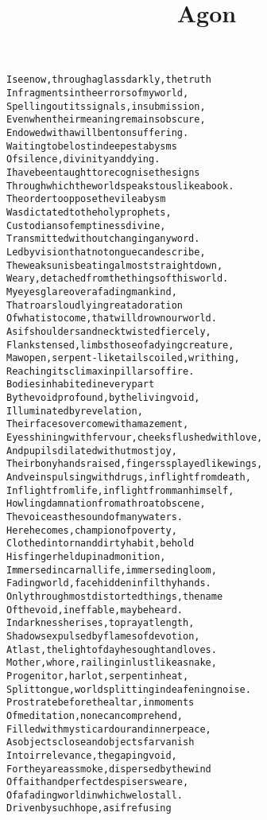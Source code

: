 \documentclass{article}
\title{Agon}
\begin{document}
\maketitle

\clearpage

\begin{alltt}\normalfont
I see now, through a glass darkly, the truth
In fragments in the errors of my world,
Spelling out its signals, in submission,
Even when their meaning remains obscure,
Endowed with a will bent on suffering.
Waiting to be lost in deepest abysms
Of silence, divinity and dying.
I have been taught to recognise the signs
Through which the world speaks to us like a book.
The order to oppose the vile abysm
Was dictated to the holy prophets,
Custodians of emptiness divine,
Transmitted without changing any word.
Led by vision that no tongue can describe,
The weak sun is beating almost straight down,
Weary, detached from the things of this world.
My eyes glare over a fading mankind,
That roars loudly in great adoration
Of what is to come, that will drown our world.
As if shoulders and neck twisted fiercely,
Flanks tensed, limbs those of a dying creature,
Maw open, serpent-like tails coiled, writhing,
Reaching its climax in pillars of fire.
Bodies inhabited in every part
By the void profound, by the living void,
Illuminated by revelation,
Their faces overcome with amazement,
Eyes shining with fervour, cheeks flushed with love,
And pupils dilated with utmost joy,
Their bony hands raised, fingers splayed like wings,
And veins pulsing with drugs, in flight from death,
In flight from life, in flight from man himself,
Howling damnation from a throat obscene,
The voice as the sound of many waters.
Here he comes, champion of poverty,
Clothed in torn and dirty habit, behold
His finger held up in admonition,
Immersed in carnal life, immersed in gloom,
Fading world, face hidden in filthy hands.
Only through most distorted things, the name
Of the void, ineffable, may be heard.
In darkness he rises, to pray at length,
Shadows expulsed by flames of devotion,
At last, the light of day he sought and loves.
Mother, whore, railing in lust like a snake,
Progenitor, harlot, serpent in heat,
Split tongue, world splitting in deafening noise.
Prostrate before the altar, in moments
Of meditation, none can comprehend,
Filled with mystic ardour and inner peace,
As objects close and objects far vanish
Into irrelevance, the gaping void,
For they are as smoke, dispersed by the wind
Of faith and perfect despisers we are,
Of a fading world in which we lost all.
Driven by such hope, as if refusing

\end{alltt}
\end{document}
